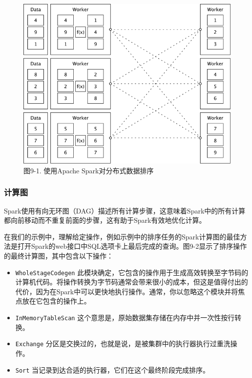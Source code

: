 \documentclass[
]{article}
\providecommand{\tightlist}{%
  \setlength{\itemsep}{0pt}\setlength{\parskip}{0pt}}
\begin{document}
\begin{figure}
\centering
\includegraphics{figures/9_1.png}
\caption{图9-1. 使用Apache Spark对分布式数据排序}
\end{figure}

\hypertarget{ux8ba1ux7b97ux56fe}{%
\subsubsection{计算图}\label{ux8ba1ux7b97ux56fe}}

Spark使用有向无环图（DAG）描述所有计算步骤，这意味着Spark中的所有计算都向前移动而不重复前面的步骤，这有助于Spark有效地优化计算。

在我们的示例中，理解给定操作，例如示例中的排序任务的Spark计算图的最佳方法是打开Spark的web接口中SQL选项卡上最后完成的查询。图9-2显示了排序操作的最终计算图，其中包含以下操作：

\begin{itemize}
\tightlist
\item
  \texttt{WholeStageCodegen}
  此模块确定，它包含的操作用于生成高效转换至字节码的计算机代码。将操作转换为字节码通常会带来很小的成本，但这是值得付出的代价，因为在Spark中可以更快地执行操作。通常，你以忽略这个模块并将焦点放在它包含的操作上。
\item
  \texttt{InMemoryTableScan}
  这个意思是，原始数据集存储在内存中并一次性按行转换。
\item
  \texttt{Exchange}
  分区是交换过的，也就是说，是被集群中的执行器执行过重洗操作。
\item
  \texttt{Sort} 当记录到达合适的执行器，它们在这个最终阶段完成排序。
\end{itemize}
\end{document}
